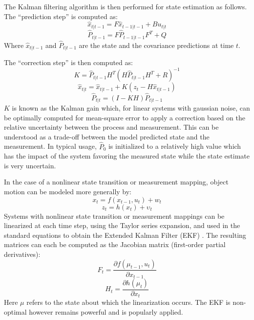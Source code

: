 \documentclass[a4paper,twoside,12pt]{report}
\begin{document}
The Kalman filtering algorithm is then performed for state estimation as follows. The ``prediction step'' is computed as:
\begin{equation}
\hat{x}_{t|t-1}=F\hat{x}_{t-1|t-1}+Bu_{t|t}
\end{equation}
\begin{equation}
\hat{P}_{t|t-1}=F\hat{P}_{t-1|t-1}F^T+Q 
\end{equation}
Where $\hat{x}_{t|t-1}$ and $\hat{P}_{t|t-1}$ are the state and the covariance predictions at  time $t$. 

The ``correction step'' is then computed as:
\begin{equation} 
K = \hat{P}_{t|t-1}H^T(H\hat{P}_{t|t-1}H^T+R)^{-1}
\end{equation}
\begin{equation} 
\hat{x}_{t|t} = \hat{x}_{t|t-1}+K(z_t-H\hat{x}_{t|t-1})
\end{equation}
\begin{equation} 
\hat{P}_{t|t}=(I-KH)\hat{P}_{t|t-1}
\end{equation}
$K$ is known as the Kalman gain which, for linear systems with gaussian noise, can be optimally computed for mean-square error to apply a correction based on the relative uncertainty between the process and measurement. This can be understood as a trade-off between the model predicted state and the measurement. In typical usage, $\hat{P}_0$ is initialized to a relatively high value which has the impact of the system favoring the measured state while the state estimate is very uncertain.

In the case of a nonlinear state transition or measurement mapping, object motion can be modeled more generally by:
\begin{equation} 
x_t=f(x_{t-1},u_{t})+w_{t}
\end{equation}
\begin{equation} 
z_t=h(x_{t})+{\upsilon}_t
\end{equation}
Systems with nonlinear state transition or measurement mappings can be linearized at each time step, using the Taylor series expansion, and used in the standard equations to obtain the Extended Kalman Filter (EKF) \citep{trackbook}. The resulting matrices can each be computed as the Jacobian matrix (first-order partial derivatives):
\begin{equation}
F_t = \frac{\partial f(\mu_{t-1}, u_{t})}{\partial x_{t-1}}
\end{equation}
\begin{equation} 
H_t = \frac{\partial h(\mu_{t})}{\partial x_t} 
\end{equation}
Here $\mu$ refers to the state about which the linearization occurs. The EKF is non-optimal however remains powerful and is popularly applied.
\end{document}
